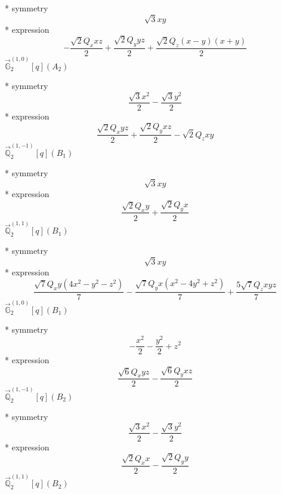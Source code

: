 \documentclass[fleqn,8pt]{jsarticle}
\begin{document}
\noindent\quad ** symmetry
\begin{dmath*}
\sqrt{3} x y
\end{dmath*}
\noindent\quad ** expression
\begin{dmath*}
- \frac{\sqrt{2} Q_{x} x z}{2} + \frac{\sqrt{2} Q_{y} y z}{2} + \frac{\sqrt{2} Q_{z} \left(x - y\right) \left(x + y\right)}{2}
\end{dmath*}
\noindent\quad $\vec{\mathbb{G}}_{2}^{(1,0)}[q](A_{2})$

\noindent\quad ** symmetry
\begin{dmath*}
\frac{\sqrt{3} x^{2}}{2} - \frac{\sqrt{3} y^{2}}{2}
\end{dmath*}
\noindent\quad ** expression
\begin{dmath*}
\frac{\sqrt{2} Q_{x} y z}{2} + \frac{\sqrt{2} Q_{y} x z}{2} - \sqrt{2} Q_{z} x y
\end{dmath*}
\noindent\quad $\vec{\mathbb{Q}}_{2}^{(1,-1)}[q](B_{1})$

\noindent\quad ** symmetry
\begin{dmath*}
\sqrt{3} x y
\end{dmath*}
\noindent\quad ** expression
\begin{dmath*}
\frac{\sqrt{2} Q_{x} y}{2} + \frac{\sqrt{2} Q_{y} x}{2}
\end{dmath*}
\noindent\quad $\vec{\mathbb{Q}}_{2}^{(1,1)}[q](B_{1})$

\noindent\quad ** symmetry
\begin{dmath*}
\sqrt{3} x y
\end{dmath*}
\noindent\quad ** expression
\begin{dmath*}
\frac{\sqrt{7} Q_{x} y \left(4 x^{2} - y^{2} - z^{2}\right)}{7} - \frac{\sqrt{7} Q_{y} x \left(x^{2} - 4 y^{2} + z^{2}\right)}{7} + \frac{5 \sqrt{7} Q_{z} x y z}{7}
\end{dmath*}
\noindent\quad $\vec{\mathbb{G}}_{2}^{(1,0)}[q](B_{1})$

\noindent\quad ** symmetry
\begin{dmath*}
- \frac{x^{2}}{2} - \frac{y^{2}}{2} + z^{2}
\end{dmath*}
\noindent\quad ** expression
\begin{dmath*}
\frac{\sqrt{6} Q_{x} y z}{2} - \frac{\sqrt{6} Q_{y} x z}{2}
\end{dmath*}
\noindent\quad $\vec{\mathbb{Q}}_{2}^{(1,-1)}[q](B_{2})$

\noindent\quad ** symmetry
\begin{dmath*}
\frac{\sqrt{3} x^{2}}{2} - \frac{\sqrt{3} y^{2}}{2}
\end{dmath*}
\noindent\quad ** expression
\begin{dmath*}
\frac{\sqrt{2} Q_{x} x}{2} - \frac{\sqrt{2} Q_{y} y}{2}
\end{dmath*}
\noindent\quad $\vec{\mathbb{Q}}_{2}^{(1,1)}[q](B_{2})$
\end{document}
